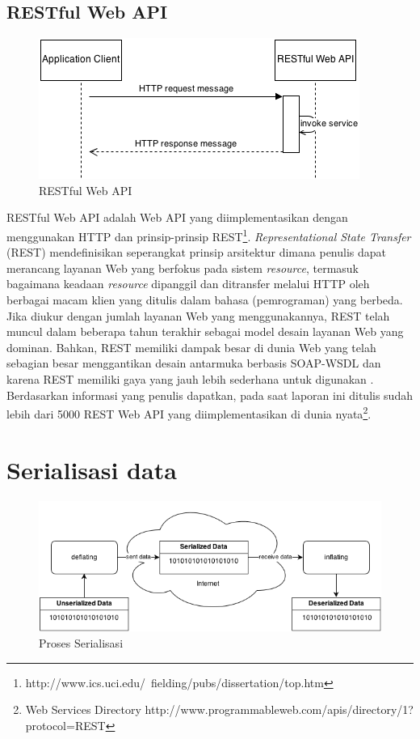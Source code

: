 \documentclass[a4paper, 12pt]{report}
\begin{document}
\subsection{RESTful Web API}
\begin{figure}[htp]
\centering
\includegraphics[scale=1.00]{images/RESTful-web-api.png}
\caption{RESTful Web API}
\label{RESTful Web API}
\end{figure}
\onehalfspacing RESTful Web API adalah Web API yang diimplementasikan dengan menggunakan HTTP dan prinsip-prinsip REST\footnote{http://www.ics.uci.edu/~fielding/pubs/dissertation/top.htm}. \textit{Representational State Transfer} (REST) mendefinisikan seperangkat prinsip arsitektur dimana penulis dapat merancang layanan Web yang berfokus pada sistem \textit{resource}, termasuk bagaimana keadaan \textit{resource} dipanggil dan ditransfer melalui HTTP oleh berbagai macam klien yang ditulis dalam bahasa (pemrograman) yang berbeda. Jika diukur dengan jumlah layanan Web yang menggunakannya, REST telah muncul dalam beberapa tahun terakhir sebagai model desain layanan Web yang dominan. Bahkan, REST memiliki dampak besar di dunia Web yang telah sebagian besar menggantikan desain antarmuka berbasis SOAP-WSDL dan karena REST memiliki gaya yang jauh lebih sederhana untuk digunakan \cite{ws-restful}. Berdasarkan informasi yang penulis dapatkan, pada saat laporan ini ditulis sudah lebih dari 5000 REST Web API yang diimplementasikan di dunia nyata\footnote{Web Services Directory http://www.programmableweb.com/apis/directory/1?protocol=REST}.

\section{Serialisasi data}

\onehalfspacing

\begin{figure}[htp]
\centering
\includegraphics[scale=0.65]{images/serialization-process.png}
\caption{Proses Serialisasi}
\label{Proses Serialisasi}
\end{figure}
\end{document}
